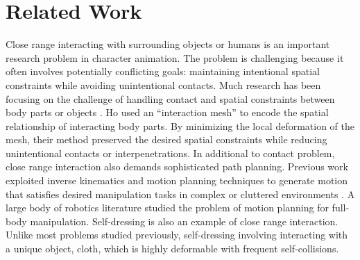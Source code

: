 \section{Related Work}

Close range interacting with surrounding objects or humans is an important research problem in character animation. The problem is challenging because it often involves potentially conflicting goals: maintaining intentional spatial constraints while avoiding unintentional contacts. Much research has been focusing on the challenge of handling contact and spatial constraints between body parts or objects \cite{Gleicher:1998:RMN,Liu:2006:CCO,Ho:2009:CMS,Kim:2009:SMM,Ho:2010:SRP}. Ho \etal {} used an ``interaction mesh'' to encode the spatial relationship of interacting body parts. By minimizing the local deformation of the mesh, their method preserved the desired spatial constraints while reducing unintentional contacts or interpenetrations. In additional to contact problem, close range interaction also demands sophisticated path planning. Previous work exploited inverse kinematics and motion planning techniques to generate motion that satisfies desired manipulation tasks in complex or cluttered environments \cite{Kallmann:2003:PCF,Yamane:2004:SAH,Bai:2012:SCO}. A large body of robotics literature studied the problem of motion planning for full-body manipulation\cite{Harada:2003:PMH,Takubo:2005:PAO,Yoshida:2005:HMP,Nishiwaki:2006:MCS}. Self-dressing is also an example of close range interaction. Unlike most problems studied previously, self-dressing involving interacting with a unique object, cloth, which is highly deformable with frequent self-collisions. 



